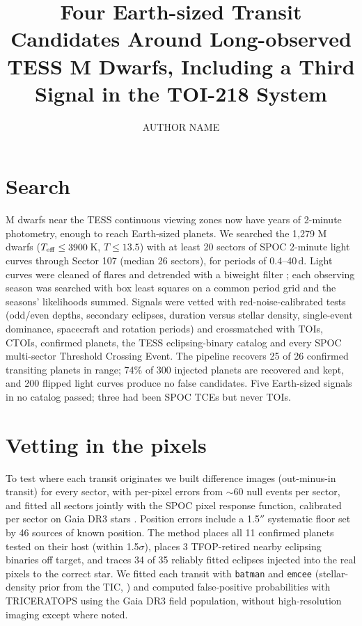 \documentclass[RNAAS]{aastex631}
\begin{document}
\title{Four Earth-sized Transit Candidates Around Long-observed TESS M Dwarfs, Including a Third Signal in the TOI-218 System}
\author{AUTHOR NAME}

\section{Search}
M dwarfs near the TESS continuous viewing zones now have years of 2-minute photometry, enough to reach
Earth-sized planets. We searched the 1,279 M dwarfs ($T_{\rm eff}\le3900$\,K, $T\le13.5$) with at
least 20 sectors of SPOC 2-minute light curves through Sector 107 (median 26 sectors), for periods of
0.4--40\,d. Light curves were cleaned of flares and detrended with a biweight filter \citep{hippke2019}; each
observing season was searched with box least squares \citep{kovacs2002} on a common period grid
\citep{ofir2014} and the seasons' likelihoods summed. Signals were vetted with red-noise-calibrated tests
(odd/even depths, secondary eclipses, duration versus stellar density, single-event dominance, spacecraft
and rotation periods) and crossmatched with TOIs, CTOIs, confirmed planets, the TESS eclipsing-binary
catalog and every SPOC multi-sector Threshold Crossing Event. The pipeline recovers 25 of 26 confirmed
transiting planets in range; 74\% of 300 injected planets are recovered and kept, and 200 flipped light
curves produce no false candidates. Five Earth-sized signals in no catalog passed; three had been SPOC TCEs
but never TOIs.

\section{Vetting in the pixels}
To test where each transit originates we built difference images (out-minus-in transit) for every sector,
with per-pixel errors from $\sim$60 null events per sector, and fitted all sectors jointly with the SPOC
pixel response function, calibrated per sector on Gaia DR3 stars \citep{gaia2023}. Position errors include a
1.5$''$ systematic floor set by 46 sources of known position. The
method places all 11 confirmed planets tested on their host (within 1.5$\sigma$),
places 3 TFOP-retired nearby eclipsing binaries off target, and traces 34 of 35
reliably fitted eclipses injected into the real pixels to the correct star. We fitted each transit with \texttt{batman}
\citep{kreidberg2015} and \texttt{emcee} \citep{foreman2013} (stellar-density prior from the TIC,
\citealt{stassun2019}) and computed false-positive probabilities with TRICERATOPS \citep{giacalone2021}
using the Gaia DR3 field population, without high-resolution imaging except where noted.
\end{document}
